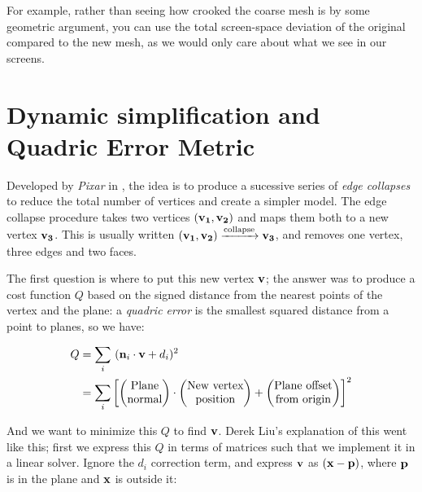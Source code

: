\spa

For example, rather than seeing how crooked the coarse mesh is
by some geometric argument, you can use the total screen-space
deviation of the original compared to the new mesh, as we would
only care about what we see in our screens.

\section{Dynamic simplification and Quadric Error Metric}

Developed by \emph{Pixar} in \cite{LOD1}, the idea is to produce a
sucessive series of \emph{edge collapses} to reduce the total number
of vertices and create a simpler model. The edge collapse procedure
takes two vertices $\bf{(v_1,v_2)}$ and maps them both to a new
vertex $\bf{v_3}$. This is usually written 
$\bf{(v_1,v_2)} \xrightarrow{\text{collapse}} \bf{v_3}$, and
removes one vertex, three edges and two faces.

\spa

The first question is where to put this new vertex $\bf{v}$; the answer
was to produce a cost function $Q$ based on the signed distance from the nearest
points of the vertex and the plane: a \emph{quadric error} is the smallest squared distance from a point to planes, so we have:

\begin{align*}
    Q &= \sum_i \ (\bf{n}_i \cdot \bf{v} + d_i )^2 \\
    &= \sum_i 
\left [ \begin{pmatrix}
\text{Plane} \\
\text{normal}
\end{pmatrix}
\cdot
\begin{pmatrix}
\text{New vertex} \\
\text{position}
\end{pmatrix} +
\begin{pmatrix}
\text{Plane offset} \\
\text{from origin}
\end{pmatrix} \right ]^2
\end{align*}

And we want to minimize this $Q$ to find $\bf{v}$.
Derek Liu's explanation of this went like this; first we
express this $Q$ in terms of matrices such that we implement it
in a linear solver. Ignore the $d_i$ correction term, and express
$\bf{v}$ as $\bf{(x-p)}$, where $\bf{p}$ is in the plane
and $\bf{x}$ is outside it:

